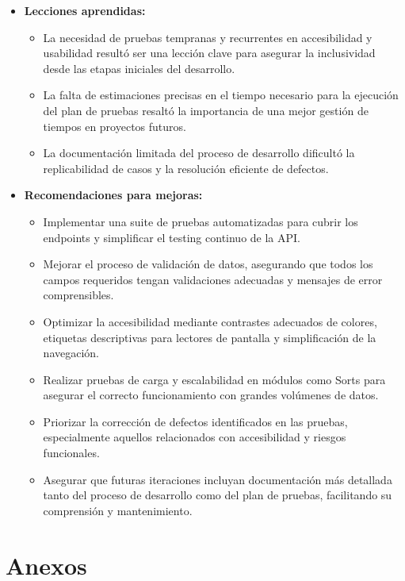 \documentclass[stu, 12pt, letterpaper, donotrepeattitle, floatsintext, natbib]{apa7}
\begin{document}
\begin{itemize}
    \item \textbf{Lecciones aprendidas:}
    \begin{itemize}
        \item La necesidad de pruebas tempranas y recurrentes en accesibilidad y usabilidad result\'o ser una lecci\'on clave para asegurar la inclusividad desde las etapas iniciales del desarrollo.
        \item La falta de estimaciones precisas en el tiempo necesario para la ejecuci\'on del plan de pruebas resalt\'o la importancia de una mejor gesti\'on de tiempos en proyectos futuros.
        \item La documentaci\'on limitada del proceso de desarrollo dificult\'o la replicabilidad de casos y la resoluci\'on eficiente de defectos.
    \end{itemize}

    \item \textbf{Recomendaciones para mejoras:}
    \begin{itemize}
        \item Implementar una suite de pruebas automatizadas para cubrir los endpoints y simplificar el testing continuo de la API.
        \item Mejorar el proceso de validaci\'on de datos, asegurando que todos los campos requeridos tengan validaciones adecuadas y mensajes de error comprensibles.
        \item Optimizar la accesibilidad mediante contrastes adecuados de colores, etiquetas descriptivas para lectores de pantalla y simplificaci\'on de la navegaci\'on.
        \item Realizar pruebas de carga y escalabilidad en m\'odulos como Sorts para asegurar el correcto funcionamiento con grandes vol\'umenes de datos.
        \item Priorizar la correcci\'on de defectos identificados en las pruebas, especialmente aquellos relacionados con accesibilidad y riesgos funcionales.
        \item Asegurar que futuras iteraciones incluyan documentaci\'on m\'as detallada tanto del proceso de desarrollo como del plan de pruebas, facilitando su comprensi\'on y mantenimiento.
    \end{itemize}
\end{itemize}



\newpage
\section{\large Anexos}
\end{document}
